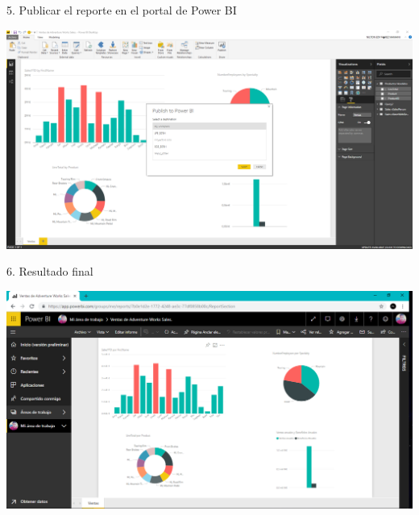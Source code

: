 \begin{itemize}
5. Publicar el reporte en el portal de Power BI
\end{itemize}

\begin{center}
\includegraphics[width=15cm]{./Imagenes/imagen5} 
\end{center}

\begin{itemize}
6. Resultado final
\end{itemize}

\begin{center}
\includegraphics[width=15cm]{./Imagenes/imagen6} 
\end{center}